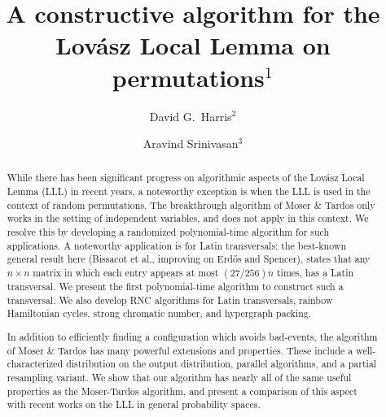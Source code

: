 \title[A constructive algorithm for the LLL on permutations]{A constructive algorithm for the Lov\'{a}sz Local Lemma on permutations$^{1}$}

\author[David G. Harris and Aravind Srinivasan]{
{\sc David G.~Harris}$^{2}$
\and
{\sc Aravind Srinivasan}$^{3}$
}

\setcounter{footnote}{0}
\addtocounter{footnote}{1}

\addtocounter{footnote}{1}
\addtocounter{footnote}{1}


\maketitle
\begin{abstract}
 While there has been significant progress on algorithmic aspects of the Lov\'{a}sz Local Lemma (LLL) in recent years, a noteworthy exception is when the LLL is used in the context of random permutations. The breakthrough algorithm of Moser \& Tardos only works in the setting of independent variables, and does not apply in this context. 
We resolve this by developing a randomized polynomial-time algorithm for such applications. A noteworthy application is for Latin transversals: the best-known general result here (Bissacot et al., improving on Erd\H{o}s and Spencer), states that any $n \times n$ matrix  in which each entry appears at most $(27/256)n$ times, has a Latin transversal. We present the first polynomial-time algorithm to construct such a transversal. We also develop RNC algorithms for Latin transversals, rainbow Hamiltonian cycles, strong chromatic number, and hypergraph packing. 

In addition to efficiently finding a configuration which avoids bad-events, the algorithm of Moser \& Tardos has many powerful extensions and properties. These include a well-characterized distribution on the output distribution, parallel algorithms, and a partial resampling variant. We show that our algorithm has nearly all of the same useful properties as the Moser-Tardos algorithm, and present a comparison of this aspect with recent works on the LLL in general probability spaces. 
\end{abstract}


